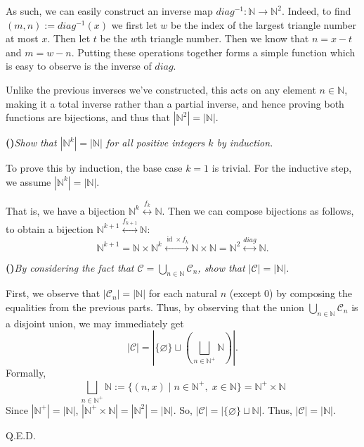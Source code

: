 \documentclass{amsart}
\newcommand{\N}{\mathbb{N}}
\newcommand{\calC}{\mathcal{C}}
\newcounter{qpart}
\newcommand{\qpart}[1]{%
  \stepcounter{qpart}%
  \bigskip\noindent\textbf{(\alph{qpart})}\quad\textit{#1}\par\bigskip%
}
\begin{document}
\bigskip
As such, we can easily construct an inverse map $diag^{-1} \colon \N \to \N^2$. Indeed, to find $(m,n) := diag^{-1}(x)$ we first let $w$ be the index of the largest triangle number at most $x$.
Then let $t$ be the $w$th triangle number. Then we know that $n = x - t$ and $m = w - n$.
Putting these operations together forms a simple function which is easy to observe is the inverse of $diag$.

Unlike the previous inverses we've constructed, this acts on any element $n \in \N$, making it a total inverse rather than a partial inverse, and hence proving both functions are bijections, and thus that $|\N^2| = |\N|$.

\qpart{Show that $|\N^k| = |\N|$ for all positive integers $k$ by induction.}

To prove this by induction, the base case $k = 1$ is trivial. For the inductive step, we assume $|\N^k| = |\N|$.

\bigskip
That is, we have a bijection $\N^k \overset{f_k}\longleftrightarrow \N$. Then we can compose bijections as follows, to obtain a bijection $\N^{k+1} \overset{f_{k+1}}\longleftrightarrow \N$:
\[
    \N^{k+1} = \N \times \N^k \overset{\operatorname{id}\times f_k}\longleftrightarrow \N \times \N = \N^2 \overset{diag}\longleftrightarrow \N.
\]

\qpart{By considering the fact that $\calC = \bigcup_{n\in\N}\calC_n$, show that $|\calC| = |\N|$.}

First, we observe that $|\calC_n| = |\N|$ for each natural $n$ (except 0) by composing the equalities from the previous parts. 
Thus, by observing that the union $\bigcup_{n\in\N}\calC_n$ is a disjoint union, we may immediately get 
\[
|\calC| = \left|\{\varnothing\}\sqcup\left(\bigsqcup_{n\in\N^+}\N\right)\right|.
\]
Formally, 
\[
    \bigsqcup_{n\in\N^+}\N := \{(n,x)\;|\;n\in\N^+,\;x\in\N\} = \N^+ \times \N
\]
Since $|\N^+| = |\N|$, $|\N^+ \times \N| = |\N^2| = |\N|$. So, $|\calC| = |\{\varnothing\}\sqcup \N|$. Thus, $|\calC| = |\N|$.

\begin{flushright}
Q.E.D.
\end{flushright}
\end{document}
